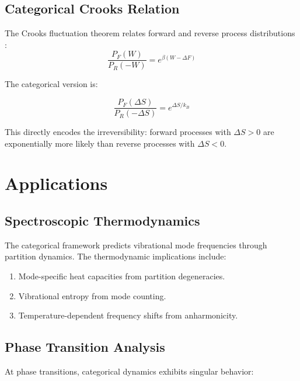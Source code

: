 \subsection{Categorical Crooks Relation}

The Crooks fluctuation theorem relates forward and reverse process distributions \cite{crooks1999}:
\begin{equation}
    \frac{P_F(W)}{P_R(-W)} = e^{\beta(W - \Delta F)}
\end{equation}

The categorical version is:

\begin{theorem}
\begin{equation}
    \frac{P_F(\Delta S)}{P_R(-\Delta S)} = e^{\Delta S/k_B}
\end{equation}
\end{theorem}

This directly encodes the irreversibility: forward processes with $\Delta S > 0$ are exponentially more likely than reverse processes with $\Delta S < 0$.

\section{Applications}

\subsection{Spectroscopic Thermodynamics}

The categorical framework predicts vibrational mode frequencies through partition dynamics. The thermodynamic implications include:

\begin{enumerate}
    \item Mode-specific heat capacities from partition degeneracies.
    \item Vibrational entropy from mode counting.
    \item Temperature-dependent frequency shifts from anharmonicity.
\end{enumerate}

\subsection{Phase Transition Analysis}

At phase transitions, categorical dynamics exhibits singular behavior:

